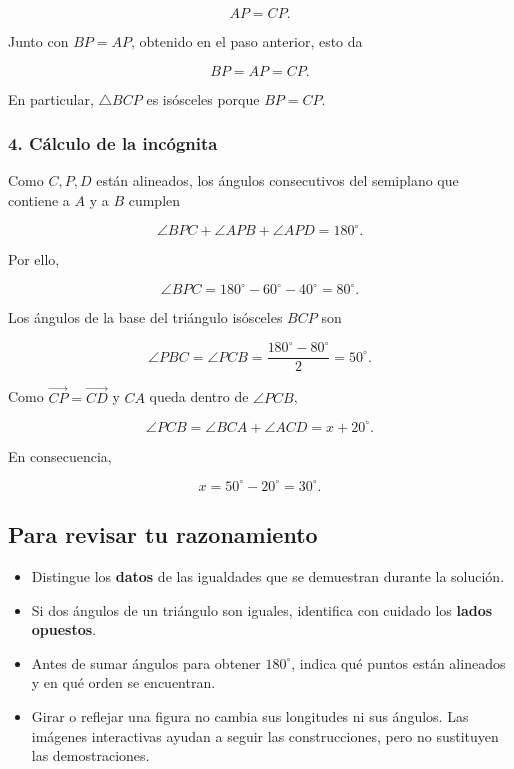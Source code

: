 \documentclass[a4paper,11pt]{article}
\newcommand{\tightlist}{\setlength{\itemsep}{0pt}\setlength{\parskip}{0pt}}
\begin{document}
\[AP=CP.\]

Junto con \(BP=AP\), obtenido en el paso anterior, esto da

\[\boxed{BP=AP=CP.}\]

En particular, \(\triangle BCP\) es isósceles porque \(BP=CP\).

\hypertarget{cuxe1lculo-de-la-incuxf3gnita-1}{%
\subsubsection*{4. Cálculo de la
incógnita}\label{cuxe1lculo-de-la-incuxf3gnita-1}}

Como \(C,P,D\) están alineados, los ángulos consecutivos del semiplano
que contiene a \(A\) y a \(B\) cumplen

\[\angle BPC+\angle APB+\angle APD=180^\circ.\]

Por ello,

\[\angle BPC=180^\circ-60^\circ-40^\circ=80^\circ.\]

Los ángulos de la base del triángulo isósceles \(BCP\) son

\[\angle PBC=\angle PCB=\frac{180^\circ-80^\circ}{2}=50^\circ.\]

Como \(\overrightarrow{CP}=\overrightarrow{CD}\) y \(CA\) queda dentro
de \(\angle PCB\),

\[\angle PCB=\angle BCA+\angle ACD=x+20^\circ.\]

En consecuencia,

\[\boxed{x=50^\circ-20^\circ=30^\circ.}\]

\hypertarget{revision}{%
\subsection*{Para revisar tu razonamiento}\label{revision}}

\begin{itemize}
\tightlist
\item
  Distingue los \textbf{datos} de las igualdades que se demuestran
  durante la solución.
\item
  Si dos ángulos de un triángulo son iguales, identifica con cuidado los
  \textbf{lados opuestos}.
\item
  Antes de sumar ángulos para obtener \(180^\circ\), indica qué puntos
  están alineados y en qué orden se encuentran.
\item
  Girar o reflejar una figura no cambia sus longitudes ni sus ángulos.
  Las imágenes interactivas ayudan a seguir las construcciones, pero no
  sustituyen las demostraciones.
\end{itemize}
\end{document}
